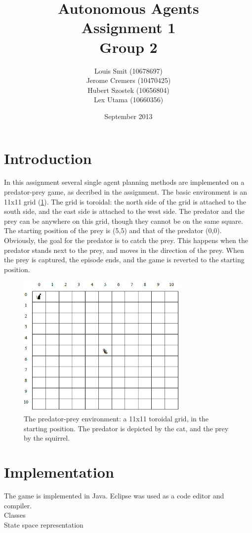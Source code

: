 \documentclass{article}
\title{Autonomous Agents \\ Assignment 1 \\ Group 2}
\author{Louis Smit (10678697) \\ Jerome Cremers (10470425) \\
Hubert Szostek (10656804) \\ Lex Utama (10660356)}
\date{September 2013}
\begin{document}
\maketitle

\section{Introduction}
In this assignment several single agent planning methods are implemented on a predator-prey game, as decribed in the assignment. The basic environment is an 11x11 grid (\ref{Grid}). The grid is
toroidal: the north side of the grid is attached to the south side, and the east side is attached to the west side. The predator and the prey can be anywhere on this grid, though they cannot be on the same square. The starting position of the prey is (5,5) and that of the predator (0,0).\\
Obviously, the goal for the predator is to catch the prey. This happens when the predator stands next to the prey, and moves in the direction of the prey. When the prey is captured, the episode ends, and the game is reverted to the starting position.

\begin{figure}[hb]
  \centering
  \includegraphics[width=3.3in]{Grid_world}
  \caption[Figure 1]
   {The predator-prey environment: a 11x11 toroidal grid, in the starting position. The predator is depicted by the cat, and the prey by the squirrel.}
   \label{Grid}
\end{figure}


\section{Implementation}
The game is implemented in Java. Eclipse was used as a code editor and compiler. \\
Classes\\
State space representation\\
\end{document}
